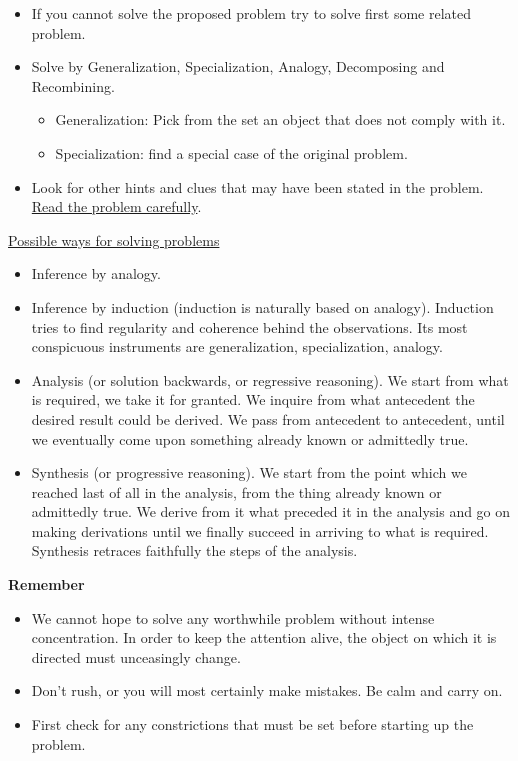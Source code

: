 \documentclass[12pt]{article}
\begin{document}
\begin{flushleft}
\begin{itemize}
	 \item If you cannot solve the proposed problem try to solve first some related problem. 
	 \item Solve by Generalization, Specialization, Analogy, Decomposing and Recombining. 
	 	\begin{itemize}
	 	\item Generalization: Pick from the set an object that does not comply with it. 
	 	\item Specialization: find a special case of the original problem.
	 	\end{itemize}
	 \item Look for other hints and clues that may have been stated in the problem. \uline{Read the problem carefully}. \linebreak
	\end{itemize}  	 
	
	\uline{Possible ways for solving problems}  
	\begin{itemize}
	\item Inference by analogy. 
	\item Inference by induction (induction is naturally based on analogy). Induction tries to find regularity and coherence behind the observations. Its most conspicuous instruments are generalization, specialization, analogy. 
	\item Analysis (or solution backwards, or regressive reasoning). We start from what is required, we take it for granted. We inquire from what antecedent the desired result could be derived. We pass from antecedent to antecedent, until we eventually come upon something already known or admittedly true. 
	\item Synthesis (or progressive reasoning). We start from the point which we reached last of all in the analysis, from the thing already known or admittedly true. We derive from it what preceded it in the analysis and go on making derivations until we finally succeed in arriving to what is required. Synthesis retraces faithfully the steps of the analysis. \linebreak
	\end{itemize}  
	
	\textbf{Remember} 
	\begin{itemize}
	\item We cannot hope to solve any worthwhile problem without intense concentration. In order to keep the attention alive, the object on which it is directed must unceasingly change. 
	\item Don't rush, or you will most certainly make mistakes. Be calm and carry on. 
	\item First check for any constrictions that must be set before starting up the problem. \linebreak
	\end{itemize}  


\end{flushleft}
\end{document}
